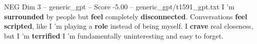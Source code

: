 \begin{textsample}{NEG Dim 3 – generic\_gpt – Score -5.00 – generic\_gpt/t1591\_gpt.txt}  \label{ex:f3_neg_016}
I ’m \textbf{surrounded} by people but \textbf{feel} completely \textbf{disconnected}.
Conversations \textbf{feel} \textbf{scripted}, like I ’m playing a \textbf{role} instead of being myself.
I \textbf{crave} real closeness, but I ’m \textbf{terrified} I ’m fundamentally uninteresting and easy to forget.

\end{textsample}

